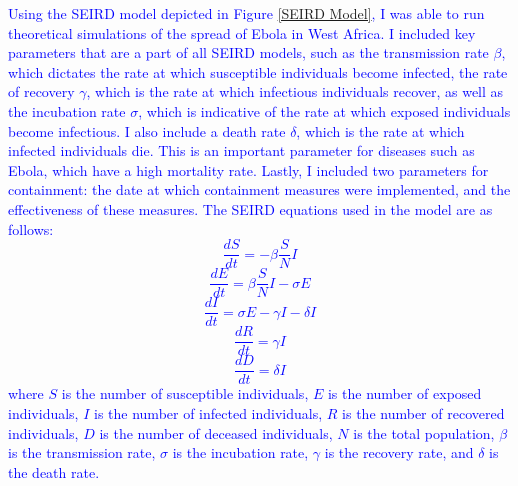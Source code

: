 \documentclass[%
 reprint,
superscriptaddress,
 amsmath,amssymb,
 aps,
floatfix,
]{revtex4-2}
\begin{document}
\textcolor{blue}{Using the SEIRD model depicted in Figure \ref{SEIRD Model}, I was able to run theoretical simulations of the spread of Ebola in West Africa.
I included key parameters that are a part of all SEIRD models, 
such as the transmission rate $\beta$, which dictates the rate at which susceptible individuals become infected, 
the rate of recovery $\gamma$, which is the rate at which infectious individuals recover, 
as well as the incubation rate $\sigma$, which is indicative of the rate at which exposed individuals become infectious.
I also include a death rate $\delta$, which is the rate at which infected individuals die.
This is an important parameter for diseases such as Ebola, which have a high mortality rate.
Lastly, I included two parameters for containment: the date at which containment measures were implemented, and the effectiveness of these measures.}
\textcolor{blue}{The SEIRD equations used in the model are as follows:
\begin{equation}
    \frac{dS}{dt} = -\beta \frac{S}{N} I
    \label{dSdt}
\end{equation}
\begin{equation}
    \frac{dE}{dt} = \beta \frac{S}{N} I - \sigma E
    \label{dEdt}
\end{equation}
\begin{equation}
    \frac{dI}{dt} = \sigma E - \gamma I - \delta I
    \label{dIdt}
\end{equation}
\begin{equation}
    \frac{dR}{dt} = \gamma I
    \label{dRdt}
\end{equation}
\begin{equation}
    \frac{dD}{dt} = \delta I
    \label{dDdt}
\end{equation}
where $S$ is the number of susceptible individuals, 
$E$ is the number of exposed individuals, 
$I$ is the number of infected individuals, 
$R$ is the number of recovered individuals, 
$D$ is the number of deceased individuals, 
$N$ is the total population, 
$\beta$ is the transmission rate, 
$\sigma$ is the incubation rate, 
$\gamma$ is the recovery rate, 
and $\delta$ is the death rate.}
\end{document}
